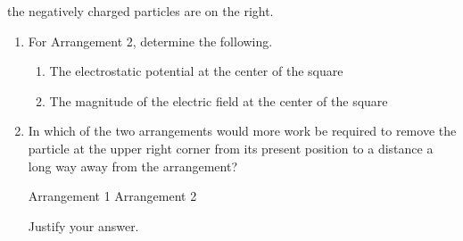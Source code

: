 \documentclass{../../../oss-apphys}
\begin{document}
\begin{enumerate}[leftmargin=15pt]
  the negatively charged particles are on the right.
  \begin{enumerate}[leftmargin=15pt,resume]
  \item For Arrangement 2, determine the following.
    \begin{enumerate}[leftmargin=15pt]
    \item The electrostatic potential at the center of the square
    \item The magnitude of the electric field at the center of the square
    \end{enumerate}
  \item In which of the two arrangements would more work be required to remove
    the particle at the upper right corner from its present position to a
    distance a long way away from the arrangement?

    \vspace{.1in}
    \underline{\hspace{.3in}}Arrangement 1\hspace{.5in}
    \underline{\hspace{.3in}}Arrangement 2

    \vspace{.1in}Justify your answer.
  \end{enumerate}
  \newpage
  

\end{enumerate}
\end{document}
